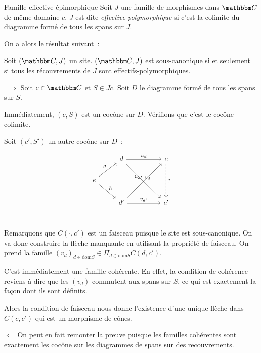 \begin{defi}{Famille effective épimorphique}
    Soit $J$ une famille de morphismes dans $\C$ de même domaine $c$. $J$ est dite
    \emph{effective polymorphique} si c'est la colimite du diagramme formé de tous
    les spans sur $J$.
\end{defi}

On a alors le résultat suivant~:

\begin{lem}
    Soit $(\C,J)$ un site. $(\C,J)$ est sous-canonique si et seulement si tous les
    récouvrements de $J$ sont effectifs-polymorphiques.
\end{lem}

\begin{pv}
    $\boxed{\implies}$ Soit $c\in \C$ et $S\in Jc$. Soit $D$ le diagramme formé
    de tous les spans sur $S$.

    Immédiatement, $(c,S)$ est un cocône sur $D$. Vérifions que c'est le cocône
    colimite.

    Soit $(c',S')$ un autre cocône sur $D$~:

    \[\begin{tikzcd}
        & d \arrow[rr, "u_d"] \arrow[rrdd, "v_d"] & & c \arrow[dd, dashed, "?"] \\
        e \arrow[ru, "g"] \arrow[rd, "h"] & & & \\
        & d' \arrow[rruu, "u_{d'}"] \arrow[rr, "v_{d'}"] & & c' \\
    \end{tikzcd}\]

    Remarquons que $C(\cdot, c')$ est un faisceau puisque le site est sous-canonique. On
    va donc construire la flèche manquante en utilisant la propriété de faisceau.
    On prend la famille $(v_d)_{d\in\text{dom}S}\in \Pi_{d\in\text{dom}S} C(d,c')$.
    
    C'est immédiatement une famille cohérente. En effet, la condition de cohérence
    reviens à dire que les $(v_d)$ commutent aux spans sur $S$, ce qui est exactement
    la façon dont ils sont définits.

    Alors la condition de faisceau nous donne l'existence d'une unique flèche dans
    $C(c,c')$ qui est un morphisme de cônes.

    $\boxed{\Longleftarrow}$ On peut en fait remonter la preuve puisque les familles 
    cohérentes sont exactement les cocône sur les diagrammes de spans sur des
    recouvrements.
\end{pv}

